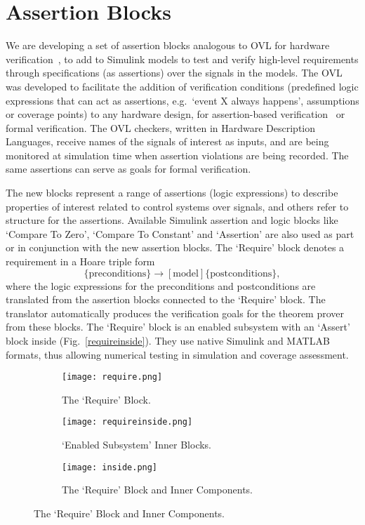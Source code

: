 \documentclass[a4paper]{article}
\begin{document}
\section{Assertion Blocks}\label{assertions}

We are developing a set of assertion blocks analogous to OVL for hardware verification~\cite{OVL}, to add to Simulink models to test and verify high-level requirements through specifications (as assertions) over the signals in the models. The OVL was developed to facilitate the addition of verification conditions (predefined logic expressions that can act as assertions, e.g.\ `event X always happens', assumptions or coverage points) to any hardware design, for assertion-based verification~\cite{assertions} or formal verification. The OVL checkers, written in Hardware Description Languages, receive names of the signals of interest as inputs, and are being monitored at simulation time when assertion violations are being recorded. The same assertions can serve as goals for formal verification.

The new blocks represent a range of assertions (logic expressions) to describe properties of interest related to control systems over signals, and others refer to structure for the assertions. Available Simulink assertion and logic blocks like `Compare To Zero', `Compare To Constant' and `Assertion' are also used as part or in conjunction with the new assertion blocks. The `Require' block denotes a requirement in a Hoare triple form~\cite{Hoare}
 \begin{equation}
\{\text{preconditions}\} \rightarrow [ \text{model} ] \{\text{postconditions}\},
\end{equation}
where the logic expressions for the preconditions and postconditions are translated from the assertion blocks connected to the `Require' block. The translator automatically produces the verification goals for the theorem prover from these blocks. The `Require' block is an enabled subsystem with an `Assert' block inside (Fig.~\ref{requireinside}). They use native Simulink and MATLAB formats, thus allowing numerical testing in simulation and coverage assessment. 

\begin{figure}[!t]
\begin{center}
\begin{subfigure}{0.33\textwidth}
                \texttt{[image: require.png]}
                \caption{The `Require' Block.}
                \label{subsystem}
        \end{subfigure}\begin{subfigure}{0.33\textwidth}
                \texttt{[image: requireinside.png]}
                \caption{`Enabled Subsystem' Inner Blocks.}
                \label{subsystem}
        \end{subfigure}\begin{subfigure}{0.33\textwidth}
                \texttt{[image: inside.png]}
                \caption{The `Require' Block and Inner Components.}
                \label{subsystem}
        \end{subfigure}\end{center}
\end{figure}
\end{document}
